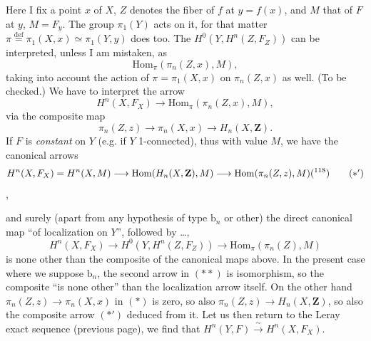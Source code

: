 \documentclass[11pt]{article}
\newcommand{\msp}[1]{\marginpar{\footnotesize [#1]}}
\begin{document}
Here I fix a point $x$ of $X$, $Z$ denotes the fiber of $f$ at $y=f(x)$, and $M$ that of $F$ at $y$, $M=F_y$. The group $\pi_1(Y)$ acts on it, for that matter $\pi \overset{\text{def}}{=} \pi_1(X,x) \simeq \pi_1(Y,y)$ does too. The $H^0(Y,H^n(Z,F_Z))$ can be interpreted, unless I am mistaken, as
\[
\mathrm{Hom}_\pi(\pi_n(Z,x),M),
\]
taking into account the action of $\pi=\pi_1(X,x)$ on $\pi_n(Z,x)$ as well. (To be checked.) We have to interpret the arrow
\[
H^n(X,F_X) \longrightarrow \mathrm{Hom}_\pi(\pi_n(Z,x),M),
\]
via the composite map
\[
\pi_n(Z,z) \longrightarrow \pi_n(X,x) \longrightarrow H_n(X,\mathbf{Z}). \tag*{$(*)$}
\]
If $F$ is \textit{constant} on $Y$ (e.g. if $Y$ 1-connected), thus with value $M$, we have the canonical arrows
\[
H^n(X,F_X) = H^n(X,M) \longrightarrow \mathrm{Hom}(H_n(X,\mathbf{Z}),M) \longrightarrow \mathrm{Hom}(\pi_n(Z,z),M)\text{(\footnotemark[118])} \tag*{$(*')$}
\]
,

\msp{page 182}
and surely (apart from any hypothesis of type $\mathrm{b}_n$ or other) the direct canonical map ``of localization on $Y$'', followed by \dots,
\[
H^n(X,F_X) \longrightarrow H^0(Y,H^n(Z,F_Z)) \longrightarrow \mathrm{Hom}_\pi(\pi_n(Z),M) \tag*{$(**)$}
\]
is none other than the composite of the canonical maps above. In the present case where we suppose $\mathrm{b}_n$, the second arrow in $(**)$ is isomorphism, so the composite ``is none other'' than the localization arrow itself. On the other hand $\pi_n(Z,z) \longrightarrow \pi_n(X,x)$ in $(*)$ is zero, so also $\pi_n(Z,z) \longrightarrow H_n(X,\mathbf{Z})$, so also the composite arrow $(*')$ deduced from it. Let us then return to the Leray exact sequence (previous page), we find that $H^n(Y,F) \xrightarrow{\ \sim\ } H^n(X,F_X)$.
\end{document}
